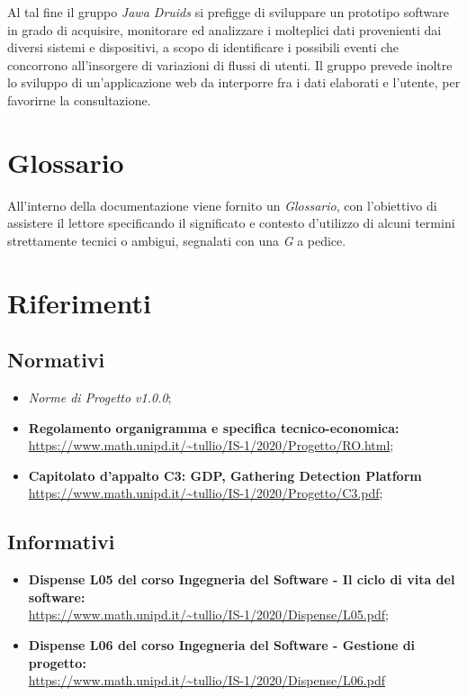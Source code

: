 Al tal fine il gruppo \textit{Jawa Druids} si prefigge di sviluppare un prototipo software in grado di acquisire, monitorare ed analizzare i molteplici dati provenienti dai diversi sistemi e dispositivi, a scopo di identificare i possibili eventi che concorrono all’insorgere di variazioni di flussi di utenti. Il gruppo prevede inoltre lo sviluppo di un'applicazione web da interporre fra i dati elaborati e l'utente, per favorirne la consultazione.

\section{Glossario}\label{IntroduzioneGlossario}

All'interno della documentazione viene fornito un \textit{Glossario}, con l'obiettivo di assistere il lettore specificando il significato e contesto d'utilizzo di alcuni termini strettamente tecnici o ambigui, segnalati con una \textit{G} a pedice.

\section{Riferimenti} \label{IntroduzioneRiferimenti}
\subsection{Normativi} \label{IntroduzioneRiferimentiNormativi}
\begin{itemize}
	\item \textit{Norme di Progetto v1.0.0};
	\item \textbf{Regolamento organigramma e specifica tecnico-economica:} \\
	\url{https://www.math.unipd.it/~tullio/IS-1/2020/Progetto/RO.html};
	\item \textbf{Capitolato d'appalto C3: GDP, Gathering Detection Platform}\\
	\url{https://www.math.unipd.it/~tullio/IS-1/2020/Progetto/C3.pdf};
\end{itemize}
\subsection{Informativi} \label{IntroduzioneRiferimentiInformativi}
\begin{itemize}
	\item \textbf{Dispense L05 del corso Ingegneria del Software - Il ciclo di vita del software:}\\
	\url{https://www.math.unipd.it/~tullio/IS-1/2020/Dispense/L05.pdf};
	\item \textbf{Dispense L06 del corso Ingegneria del Software - Gestione di progetto:} \\
	\url{https://www.math.unipd.it/~tullio/IS-1/2020/Dispense/L06.pdf}
\end{itemize}

